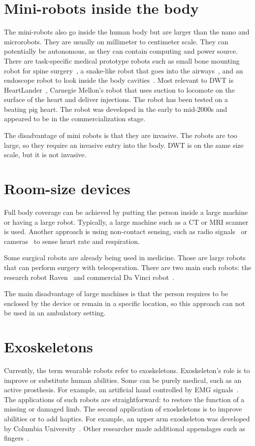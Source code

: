 \section{Mini-robots inside the body}
 The mini-robots also go inside the human body but are larger than the nano and microrobots. They are usually on millimeter to centimeter scale. They can potentially be autonomous, as they can contain computing and power source. There are task-specific medical prototype robots such as small bone mounting robot for spine surgery~\cite{shoham2003bone}, a snake-like robot that goes into the airways~\cite{simaan2004high}, and an endoscope robot to look inside the body cavities~\cite{yoon2011active}. Most relevant to DWT is HeartLander~\cite{patronik2005preliminary,patronik2004crawling}, Carnegie Mellon's robot that uses suction to locomote on the surface of the heart and deliver injections. The robot has been tested on a beating pig heart. The robot was developed in the early to mid-2000s and appeared to be in the commercialization stage.
 
 The disadvantage of mini robots is that they are invasive. The robots are too large, so they require an invasive entry into the body. DWT is on the same size scale, but it is not invasive. 

\section{Room-size devices}
Full body coverage can be achieved by putting the person inside a large machine or having a large robot. Typically, a large machine such as a CT or MRI scanner is used. 
Another approach is using non-contact sensing, such as radio signals~\cite{adib2015smart} or cameras~\cite{mcduff2014improvements} to sense heart rate and respiration. 

Some surgical robots are already being used in medicine. Those are large robots that can perform surgery with teleoperation. There are two main such robots: the research robot Raven~\cite{rosen2011raven} and commercial Da Vinci robot~\cite{tewari2002technique}.

The main disadvantage of large machines is that the person requires to be enclosed by the device or remain in a specific location, so this approach can not be used in an ambulatory setting. 

\section{Exoskeletons}
Currently, the term wearable robots refer to exoskeletons. 
Exoskeleton's role is to improve or substitute human abilities. Some can be purely medical, such as an active prosthesis. For example, an artificial hand controlled by EMG signals~\cite{bitzer2006learning}. The applications of such robots are straightforward: to restore the function of a missing or damaged limb. The second application of exoskeletons is to improve abilities or to add haptics. For example, an upper arm exoskeleton was developed by Columbia University~\cite{perry2007upper}. Other researcher made additional appendages such as fingers~\cite{leigh2016body}.


